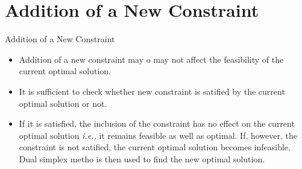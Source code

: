 
\section{Addition of a New Constraint}
\label{sec:addition-new-constraint}

\begin{frame}{Addition of a New Constraint}
  \begin{itemize} \justifying \parskip4mm
  \item Addition of a new constraint may o may not affect the feasibility of the current optimal solution.
  \item It is sufficient to check whether new constraint is satified by the current optimal solution or not.
  \item If it is satisfied, the inclusion of the constraint has no effect on the current optimal solution \emph{i.e.,} it remains feasible as well as optimal. If, however, the constraint is not satified, the current \alert{optimal solution becomes infeasible. Dual simplex metho is then used to find the new optimal solution.}
  \end{itemize}
\end{frame}

